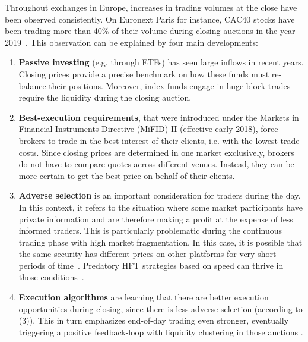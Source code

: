 \documentclass[11pt,a4paper, notitlepage]{article}
\begin{document}
	Throughout exchanges in Europe, increases in trading volumes at the close have been observed consistently. On Euronext Paris for instance, CAC40 stocks have been trading more than 40\% of their volume during closing auctions in the year 2019~\parencite{Raillon2020}. This observation can be explained by four main developments:
	
	\begin{enumerate}[(1)]
		\item \textbf{Passive investing} (e.g. through ETFs) has seen large inflows in recent years. Closing prices provide a precise benchmark on how these funds must re-balance their positions. Moreover, index funds engage in huge block trades require the liquidity during the closing auction.
		\item \textbf{Best-execution requirements}, that were introduced under the Markets in Financial Instruments Directive (MiFID) II (effective early 2018), force brokers to trade in the best interest of their clients, i.e. with the lowest trade-costs. Since closing prices are determined in one market exclusively, brokers do not have to compare quotes across different venues. Instead, they can be more certain to get the best price on behalf of their clients.
		\item \textbf{Adverse selection} is an important consideration for traders during the day. In this context, it refers to the situation where some market participants have private information and are therefore making a profit at the expense of less informed traders. This is particularly problematic during the continuous trading phase with high market fragmentation. In this case, it is possible that the same security has different prices on other platforms for very short periods of time~\parencite{BudishCramtonShim2015}. Predatory \ac{HFT} strategies based on speed can thrive in those conditions~\parencite{BiaisFoucaultMoinas2015}.
		\item \textbf{Execution algorithms} are learning that there are better execution opportunities during closing, since there is less adverse-selection (according to (3)). This in turn emphasizes end-of-day trading even stronger, eventually triggering a positive feedback-loop with liquidity clustering in those auctions \parencite{Pagano1989Volume}.
	\end{enumerate}
	
\end{document}
